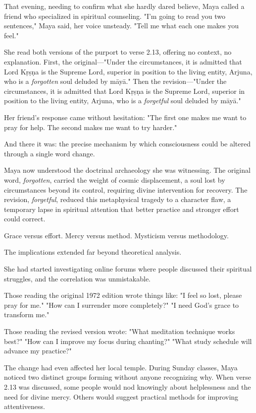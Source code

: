 \documentclass[12pt,twoside]{book}
\begin{document}
That evening, needing to confirm what she hardly dared believe, Maya called a friend who specialized in spiritual counseling. "I'm going to read you two sentences," Maya said, her voice unsteady. "Tell me what each one makes you feel."

She read both versions of the purport to verse 2.13, offering no context, no explanation. First, the original—"Under the circumstances, it is admitted that Lord Kṛṣṇa is the Supreme Lord, superior in position to the living entity, Arjuna, who is a \emph{forgotten} soul deluded by māyā." Then the revision—"Under the circumstances, it is admitted that Lord Kṛṣṇa is the Supreme Lord, superior in position to the living entity, Arjuna, who is a \emph{forgetful} soul deluded by māyā."

Her friend's response came without hesitation: "The first one makes me want to pray for help. The second makes me want to try harder."

And there it was: the precise mechanism by which consciousness could be altered through a single word change.

Maya now understood the doctrinal archaeology she was witnessing. The original word, \emph{forgotten}, carried the weight of cosmic displacement, a soul lost by circumstances beyond its control, requiring divine intervention for recovery. The revision, \emph{forgetful}, reduced this metaphysical tragedy to a character flaw, a temporary lapse in spiritual attention that better practice and stronger effort could correct.

Grace versus effort. Mercy versus method. Mysticism versus methodology.

The implications extended far beyond theoretical analysis.

She had started investigating online forums where people discussed their spiritual struggles, and the correlation was unmistakable.

Those reading the original 1972 edition wrote things like: "I feel so lost, please pray for me." "How can I surrender more completely?" "I need God's grace to transform me."

Those reading the revised version wrote: "What meditation technique works best?" "How can I improve my focus during chanting?" "What study schedule will advance my practice?"

The change had even affected her local temple. During Sunday classes, Maya noticed two distinct groups forming without anyone recognizing why. When verse 2.13 was discussed, some people would nod knowingly about helplessness and the need for divine mercy. Others would suggest practical methods for improving attentiveness.
\end{document}
